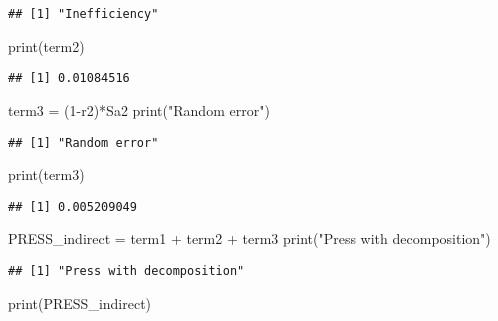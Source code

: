 \documentclass[
]{article}
\newenvironment{Shaded}{\begin{snugshade}}{\end{snugshade}}
\newcommand{\DecValTok}[1]{\textcolor[rgb]{0.00,0.00,0.81}{#1}}
\newcommand{\FunctionTok}[1]{\textcolor[rgb]{0.00,0.00,0.00}{#1}}
\newcommand{\NormalTok}[1]{#1}
\newcommand{\OtherTok}[1]{\textcolor[rgb]{0.56,0.35,0.01}{#1}}
\newcommand{\SpecialCharTok}[1]{\textcolor[rgb]{0.00,0.00,0.00}{#1}}
\newcommand{\StringTok}[1]{\textcolor[rgb]{0.31,0.60,0.02}{#1}}
\begin{document}
\begin{verbatim}
## [1] "Inefficiency"
\end{verbatim}

\begin{Shaded}
\begin{Highlighting}[]
\FunctionTok{print}\NormalTok{(term2)}
\end{Highlighting}
\end{Shaded}

\begin{verbatim}
## [1] 0.01084516
\end{verbatim}

\begin{Shaded}
\begin{Highlighting}[]
\NormalTok{term3 }\OtherTok{=}\NormalTok{ (}\DecValTok{1}\SpecialCharTok{{-}}\NormalTok{r2)}\SpecialCharTok{*}\NormalTok{Sa2}
\FunctionTok{print}\NormalTok{(}\StringTok{"Random error"}\NormalTok{)}
\end{Highlighting}
\end{Shaded}

\begin{verbatim}
## [1] "Random error"
\end{verbatim}

\begin{Shaded}
\begin{Highlighting}[]
\FunctionTok{print}\NormalTok{(term3)}
\end{Highlighting}
\end{Shaded}

\begin{verbatim}
## [1] 0.005209049
\end{verbatim}

\begin{Shaded}
\begin{Highlighting}[]
\NormalTok{PRESS\_indirect }\OtherTok{=}\NormalTok{ term1 }\SpecialCharTok{+}\NormalTok{ term2 }\SpecialCharTok{+}\NormalTok{ term3}
\FunctionTok{print}\NormalTok{(}\StringTok{"Press with decomposition"}\NormalTok{)}
\end{Highlighting}
\end{Shaded}

\begin{verbatim}
## [1] "Press with decomposition"
\end{verbatim}

\begin{Shaded}
\begin{Highlighting}[]
\FunctionTok{print}\NormalTok{(PRESS\_indirect)}
\end{Highlighting}
\end{Shaded}
\end{document}
